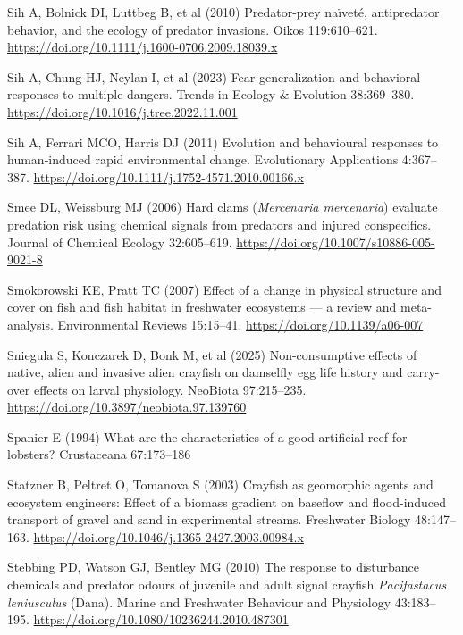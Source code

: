 \documentclass[
  12pt,
  a4paper,
  oneside]{scrbook}
\newlength{\cslhangindent}
\newenvironment{CSLReferences}[2] %
 {\begin{list}{}{%
  \setlength{\itemindent}{0pt}
  \setlength{\leftmargin}{0pt}
  \setlength{\parsep}{0pt}
  \ifodd #1
   \setlength{\leftmargin}{\cslhangindent}
   \setlength{\itemindent}{-1\cslhangindent}
  \fi
  \setlength{\itemsep}{#2\baselineskip}}}
 {\end{list}}
\begin{document}
\begin{CSLReferences}{1}{1}
Sih A, Bolnick DI, Luttbeg B, et al (2010) Predator-prey naïveté,
antipredator behavior, and the ecology of predator invasions. Oikos
119:610--621. \url{https://doi.org/10.1111/j.1600-0706.2009.18039.x}

Sih A, Chung HJ, Neylan I, et al (2023) Fear generalization and
behavioral responses to multiple dangers. Trends in Ecology \& Evolution
38:369--380. \url{https://doi.org/10.1016/j.tree.2022.11.001}

Sih A, Ferrari MCO, Harris DJ (2011) Evolution and behavioural responses
to human‐induced rapid environmental change. Evolutionary Applications
4:367--387. \url{https://doi.org/10.1111/j.1752-4571.2010.00166.x}

Smee DL, Weissburg MJ (2006) Hard clams ({\emph{Mercenaria mercenaria}})
evaluate predation risk using chemical signals from predators and
injured conspecifics. Journal of Chemical Ecology 32:605--619.
\url{https://doi.org/10.1007/s10886-005-9021-8}

Smokorowski KE, Pratt TC (2007) Effect of a change in physical structure
and cover on fish and fish habitat in freshwater ecosystems --- a review
and meta-analysis. Environmental Reviews 15:15--41.
\url{https://doi.org/10.1139/a06-007}

Sniegula S, Konczarek D, Bonk M, et al (2025) Non-consumptive effects of
native, alien and invasive alien crayfish on damselfly egg life history
and carry-over effects on larval physiology. NeoBiota 97:215--235.
\url{https://doi.org/10.3897/neobiota.97.139760}

Spanier E (1994) What are the characteristics of a good artificial reef
for lobsters? Crustaceana 67:173--186

Statzner B, Peltret O, Tomanova S (2003) Crayfish as geomorphic agents
and ecosystem engineers: Effect of a biomass gradient on baseflow and
flood-induced transport of gravel and sand in experimental streams.
Freshwater Biology 48:147--163.
\url{https://doi.org/10.1046/j.1365-2427.2003.00984.x}

Stebbing PD, Watson GJ, Bentley MG (2010) The response to disturbance
chemicals and predator odours of juvenile and adult signal crayfish
{\emph{Pacifastacus leniusculus}} ({Dana}). Marine and Freshwater
Behaviour and Physiology 43:183--195.
\url{https://doi.org/10.1080/10236244.2010.487301}


\end{CSLReferences}
\end{document}
